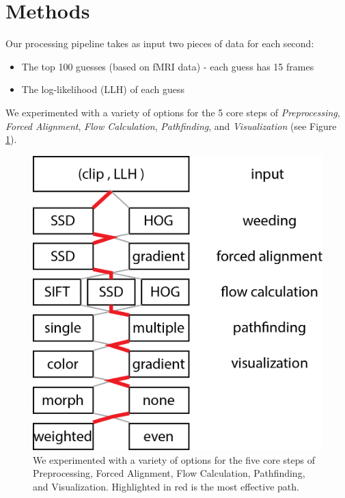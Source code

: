
\section{Methods}

Our processing pipeline takes as input two pieces of data for each second:

\begin{itemize}
\item The top 100 guesses (based on fMRI data) - each guess has 15 frames
\item The log-likelihood (LLH) of each guess
\end{itemize}

We experimented with a variety of options for the 5 core steps of \emph{Preprocessing}, \emph{Forced Alignment}, \emph{Flow Calculation}, \emph{Pathfinding}, and \emph{Visualization} (see Figure \ref{fig:system}).

\begin{figure}
\centering
    \includegraphics[width=1.0\columnwidth]{figures/system.png}
\caption{We experimented with a variety of options for the five core steps of Preprocessing, Forced Alignment, Flow Calculation, Pathfinding, and Visualization.  Highlighted in red is the most effective path.}
\label{fig:system}
\end{figure}

